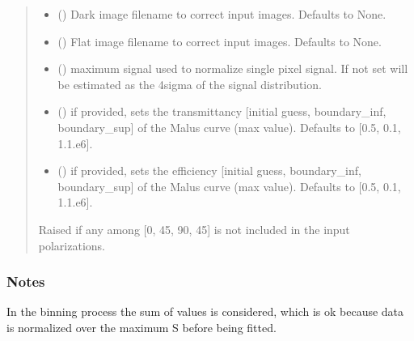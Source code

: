 \documentclass[letterpaper,10pt,english]{sphinxmanual}
\begin{document}
\begin{fulllineitems}
\begin{quote}
\begin{description}
\begin{itemize}
\item {} 
\sphinxAtStartPar
{} (\sphinxstyleliteralemphasis{\sphinxupquote{, }}) \textendash{} Dark image filename to correct input images. Defaults to None.

\item {} 
\sphinxAtStartPar
{} (\sphinxstyleliteralemphasis{\sphinxupquote{, }}) \textendash{} Flat image filename to correct input images. Defaults to None.

\item {} 
\sphinxAtStartPar
{} (\sphinxstyleliteralemphasis{\sphinxupquote{, }}) \textendash{} maximum signal used to normalize single pixel signal. If not set will be estimated as the 4sigma of the signal distribution.

\item {} 
\sphinxAtStartPar
{} () \textendash{} if provided, sets the transmittancy {[}initial guess, boundary\_inf, boundary\_sup{]} of the Malus curve (max value). Defaults to {[}0.5, 0.1, 1.\sphinxhyphen{}1.e\sphinxhyphen{}6{]}.

\item {} 
\sphinxAtStartPar
{} () \textendash{} if provided, sets the efficiency {[}initial guess, boundary\_inf, boundary\_sup{]} of the Malus curve (max value). Defaults to {[}0.5, 0.1, 1.\sphinxhyphen{}1.e\sphinxhyphen{}6{]}.

\end{itemize}

\sphinxAtStartPar
{} \textendash{} Raised if any among {[}0, 45, 90, \sphinxhyphen{}45{]} is not included in the input polarizations.

\end{description}\end{quote}
\subsubsection*{Notes}

\sphinxAtStartPar
In the binning process the sum of values is considered, which is ok because data is normalized over the maximum S before being fitted.

\end{fulllineitems}
\end{document}
